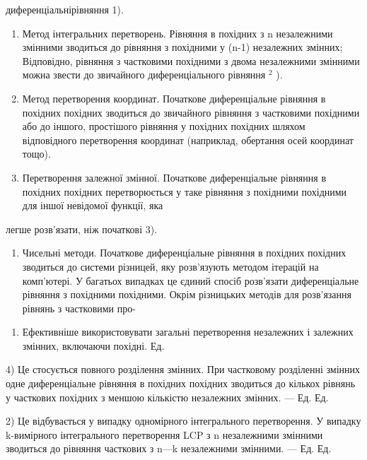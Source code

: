 \documentclass[
]{article}
\providecommand{\tightlist}{%
  \setlength{\itemsep}{0pt}\setlength{\parskip}{0pt}}
\begin{document}
диференціальнірівняння 1).

\begin{enumerate}
\def\labelenumi{\arabic{enumi}.}
\setcounter{enumi}{1}
\item
  Метод інтегральних перетворень. Рівняння в похідних з n незалежними
  змінними зводиться до рівняння з похідними у (n-1) незалежних змінних;
  Відповідно, рівняння з частковими похідними з двома незалежними
  змінними можна звести до звичайного диференціального рівняння \(^2\)
  ).
\item
  Метод перетворення координат. Початкове диференціальне рівняння в
  похідних похідних зводиться до звичайного рівняння з частковими
  похідними або до іншого, простішого рівняння у похідних похідних
  шляхом відповідного перетворення координат (наприклад, обертання осей
  координат тощо).
\item
  Перетворення залежної змінної. Початкове диференціальне рівняння в
  похідних похідних перетворюється у таке рівняння з похідними похідними
  для іншої невідомої функції, яка
\end{enumerate}

легше розв'язати, ніж початкові 3).

\begin{enumerate}
\def\labelenumi{\arabic{enumi}.}
\setcounter{enumi}{4}
\tightlist
\item
  Чисельні методи. Початкове диференціальне рівняння в похідних похідних
  зводиться до системи різницей, яку розв'язують методом ітерацій на
  комп'ютері. У багатьох випадках це єдиний спосіб розв'язати
  диференціальне рівняння з похідними похідними. Окрім різницьких
  методів для розв'язання рівнянь з частковими про-
\end{enumerate}

\begin{enumerate}
\def\labelenumi{\alph{enumi})}
\setcounter{enumi}{4}
\tightlist
\item
  Ефективніше використовувати загальні перетворення незалежних і
  залежних змінних, включаючи похідні. Ед.
\end{enumerate}

4) Це стосується повного розділення змінних. При частковому розділенні
змінних одне диференціальне рівняння в похідних похідних зводиться до
кількох рівнянь у часткових похідних з меншою кількістю незалежних
змінних. --- Ед. Ед.

2) Це відбувається у випадку одномірного інтегрального перетворення. У
випадку k-вимірного інтегрального перетворення LCP з n незалежними
змінними зводиться до рівняння часткових з n---k незалежними змінними.
--- Ед. Ед.
\end{document}
